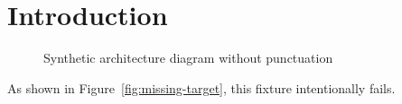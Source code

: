 \chapter{Introduction}
\vspace{1em}

\begin{figure}[h]
\centering
\fbox{\rule{0pt}{1.2in}\rule{2.0in}{0pt}}
\caption{Synthetic architecture diagram without punctuation}
\label{fig:dup}
\end{figure}

As shown in Figure~\ref{fig:missing-target}, this fixture intentionally fails.
